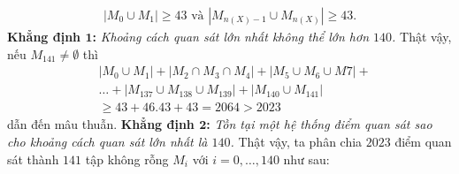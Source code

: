 \begin{multicols}{2}
	\begin{align*}
		|M_0 \cup M_1| \ge 43 \text{ và } |M_{n(X)-1} \cup M_{n(X)}| \ge 43.
	\end{align*}
	\textbf{Khẳng định $\pmb{1}$:} \textit{Khoảng cách quan sát lớn nhất không thể lớn hơn $140$.} 
	\vskip 0.1cm
	Thật vậy, nếu $M_{141} \neq \emptyset$ thì 
	\begin{align*}
		& |M_0 \cup M_1| + |M_2 \cap M_3 \cap M_4| + |M_5 \cup M_6 \cup M7| + \\
		& \ldots + |M_{137} \cup M_{138} \cup M_{139}| + |M_{140} \cup M_{141}| \\
		& \ge 43 + 46.43 + 43 = 2064 > 2023
	\end{align*}
	dẫn đến mâu thuẫn.
	\vskip 0.1cm
		\textbf{Khẳng định $\pmb{2}$:} \textit{Tồn tại một hệ thống điểm quan sát sao cho khoảng cách quan sát lớn nhất là $140$.} 
		\vskip 0.1cm
		Thật vậy, ta phân chia $2023$ điểm quan sát thành $141$ tập không rỗng $M_i$ với $i = 0, \ldots, 140$ như sau:
		\vskip 0.1cm
		\begin{figure}[H]
				\vspace*{-5pt}
				\centering
				\captionsetup{labelformat= empty, justification=centering}
\end{figure}
\end{multicols}
